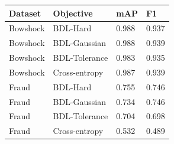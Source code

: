 \begin{tabular}{llll}
\toprule
Dataset & Objective & mAP & F1 \\
\midrule
Bowshock & BDL-Hard & 0.988 & 0.937 \\
Bowshock & BDL-Gaussian & 0.988 & 0.939 \\
Bowshock & BDL-Tolerance & 0.983 & 0.935 \\
Bowshock & Cross-entropy & 0.987 & 0.939 \\
Fraud & BDL-Hard & 0.755 & 0.746 \\
Fraud & BDL-Gaussian & 0.734 & 0.746 \\
Fraud & BDL-Tolerance & 0.704 & 0.698 \\
Fraud & Cross-entropy & 0.532 & 0.489 \\
\bottomrule
\end{tabular}
